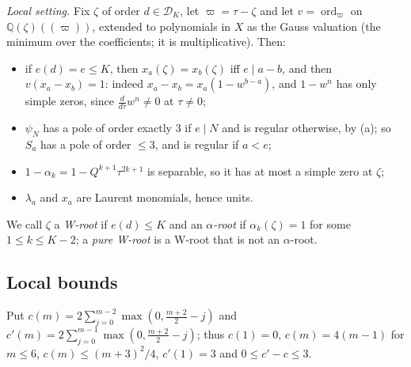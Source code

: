 \documentclass[11pt]{amsart}
\theoremstyle{definition}
\theoremstyle{remark}
\numberwithin{equation}{section}
\newcommand{\QQ}{\mathbb{Q}}
\newcommand{\cD}{\mathcal{D}}
\begin{document}
\emph{Local setting.} Fix $\zeta$ of order $d\in\cD_K$, let $\varpi=\tau-\zeta$ and let $v=\operatorname{ord}_\varpi$ on
$\QQ(\zeta)((\varpi))$, extended to polynomials in $X$ as the Gauss valuation (the minimum over the coefficients; it is
multiplicative). Then:
\begin{itemize}
\item[(a)] if $e(d)=e\le K$, then $x_a(\zeta)=x_b(\zeta)$ iff $e\mid a-b$, and then $v(x_a-x_b)=1$: indeed
$x_a-x_b=x_a(1-w^{b-a})$, and $1-w^n$ has only simple zeros, since $\frac{d}{d\tau}w^n\ne0$ at $\tau\ne0$;
\item[(b)] $\psi_N$ has a pole of order exactly $3$ if $e\mid N$ and is regular otherwise, by (a); so $S_a$ has a pole of
order $\le3$, and is regular if $a<e$;
\item[(c)] $1-\alpha_k=1-Q^{k+1}\tau^{2k+1}$ is separable, so it has at most a simple zero at $\zeta$;
\item[(d)] $\lambda_a$ and $x_a$ are Laurent monomials, hence units.
\end{itemize}
We call $\zeta$ a \emph{W-root} if $e(d)\le K$ and an \emph{$\alpha$-root} if $\alpha_k(\zeta)=1$ for some
$1\le k\le K-2$; a \emph{pure W-root} is a W-root that is not an $\alpha$-root.

\subsection{Local bounds}

Put $c(m)=2\sum_{j=0}^{m-2}\max(0,\tfrac{m+2}2-j)$ and $c'(m)=2\sum_{j=0}^{m-1}\max(0,\tfrac{m+2}2-j)$; thus
$c(1)=0$, $c(m)=4(m-1)$ for $m\le6$, $c(m)\le(m+3)^2/4$, $c'(1)=3$ and $0\le c'-c\le3$.
\end{document}
